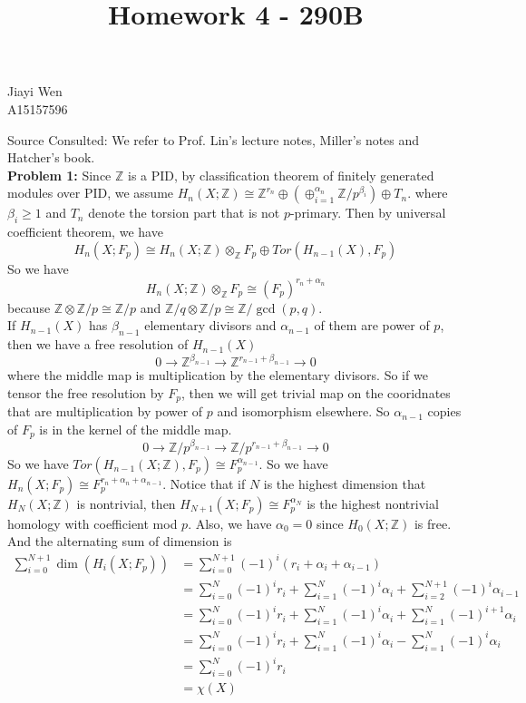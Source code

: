 \documentclass[12pt]{amsart}
\newcommand{\Z}{\mathbb{Z}}
\begin{document}
\title{Homework 4 - 290B}
\maketitle
\begin{center}
    Jiayi Wen\\
    A15157596
\end{center}
Source Consulted: We refer to Prof. Lin's lecture notes, Miller's notes and Hatcher's book. \\
\textbf{Problem 1:} Since $\Z$ is a PID, by classification theorem of finitely generated modules over PID, we assume $H_n(X;\Z)\cong \Z^{r_n}\oplus (\oplus_{i=1}^{\alpha_n}\Z/p^{\beta_i})\oplus T_n$. where $\beta_i\geq 1$ and $T_n$ denote the torsion part that is not $p$-primary. Then by universal coefficient theorem, we have 
\[H_n(X;F_p)\cong H_n(X;\Z)\otimes_\Z F_p\oplus Tor(H_{n-1}(X),F_p)\]
So we have 
\[H_n(X;\Z)\otimes_\Z F_p\cong (F_p)^{r_n+\alpha_n}\]
because $\Z\otimes\Z/p\cong \Z/p$ and $\Z/q\otimes \Z/p\cong \Z/\gcd(p,q)$.\\
If $H_{n-1}(X)$ has $\beta_{n-1}$ elementary divisors and $\alpha_{n-1}$ of them are power of $p$, then we have a free resolution of $H_{n-1}(X)$
\[0\to \Z^{\beta_{n-1}}\to \Z^{r_{n-1}+\beta_{n-1}}\to0\]
where the middle map is multiplication by the elementary divisors. So if we tensor the free resolution by $F_p$, then we will get trivial map on the cooridnates that are multiplication by power of $p$ and isomorphism elsewhere. So $\alpha_{n-1}$ copies of $F_p$ is in the kernel of the middle map. 
\[0\to \Z/p^{\beta_{n-1}}\to \Z/p^{r_{n-1}+\beta_{n-1}}\to0\]
So we have $Tor(H_{n-1}(X;\Z),F_p)\cong F_p^{\alpha_{n-1}}$.
So we have $H_n(X;F_p)\cong F_p^{r_n+\alpha_n+\alpha_{n-1}}$. Notice that if $N$ is the highest dimension that $H_N(X;\Z)$ is nontrivial, then $H_{N+1}(X;F_p)\cong F_p^{\alpha_N}$ is the highest nontrivial homology with coefficient mod $p$. Also, we have $\alpha_0=0$ since $H_0(X;\Z)$ is free. And the alternating sum of dimension is 
\begin{align*}
    \sum_{i=0}^{N+1}\dim(H_i(X;F_p))&=\sum_{i=0}^{N+1}(-1)^i(r_i+\alpha_i+\alpha_{i-1})\\
    &=\sum_{i=0}^N(-1)^ir_i+\sum_{i=1}^{N}(-1)^i\alpha_i+\sum_{i=2}^{N+1}(-1)^i\alpha_{i-1}\\
    &=\sum_{i=0}^N(-1)^ir_i+\sum_{i=1}^{N}(-1)^i\alpha_i+\sum_{i=1}^{N}(-1)^{i+1}\alpha_{i}\\
    &=\sum_{i=0}^N(-1)^ir_i+\sum_{i=1}^{N}(-1)^i\alpha_i-\sum_{i=1}^{N}(-1)^{i}\alpha_{i}\\
    &=\sum_{i=0}^N(-1)^ir_i\\
    &=\chi(X)
\end{align*}
\end{document}
